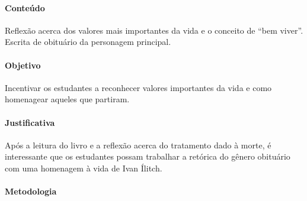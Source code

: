 \documentclass[12pt]{extarticle}
\begin{document}
\paragraph{Conteúdo} Reflexão acerca dos valores 
mais importantes da vida e o conceito de ``bem viver''.
Escrita de obituário da personagem principal.

\paragraph{Objetivo} Incentivar os estudantes a reconhecer
valores importantes da vida e como homenagear aqueles que partiram.

\paragraph{Justificativa} Após a leitura do livro e a reflexão acerca do tratamento dado à morte,
é interessante que os estudantes possam trabalhar a retórica do gênero obituário com uma homenagem à vida de Ivan Ílitch.

\paragraph{Metodologia} 
\end{document}
